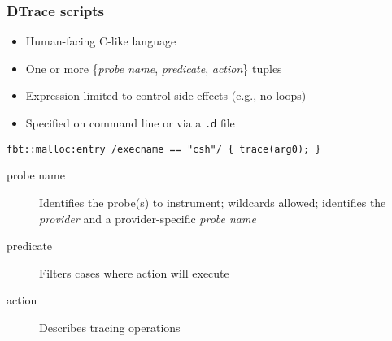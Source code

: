 \begin{frame}[fragile]
  \frametitle{DTrace scripts}

  \begin{itemize}
    \item Human-facing C-like language
    \item One or more \{\textit{probe name}, \textit{predicate},
      \textit{action}\} tuples
    \item Expression limited to control side effects (e.g., no loops)
    \item Specified on command line or via a \texttt{.d} file
  \end{itemize}

  \pause
  \smallskip

  \begin{small}
\begin{verbatim}
fbt::malloc:entry /execname == "csh"/ { trace(arg0); }
\end{verbatim}
  \end{small}

  \smallskip

  \begin{description}
    \item[probe name] Identifies the probe(s) to instrument; wildcards
      allowed; identifies the \textit{provider} and a provider-specific
      \textit{probe name}
    \item[predicate] Filters cases where action will execute
    \item[action] Describes tracing operations
  \end{description}

\end{frame}

